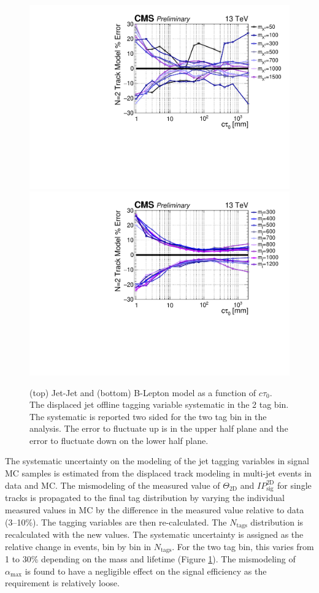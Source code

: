 \begin{figure}
\begin{center}
\includegraphics[width=.70\textwidth]{figures/an/SYSTEMATICS/76x_pu/sys_2tag_tracking.pdf}
\includegraphics[width=.70\textwidth]{figures/an/SYSTEMATICS/76x_pu/sys_2tag_tracking_dsusy.pdf}
\caption{(top) Jet-Jet and (bottom) B-Lepton
model as a function of $c\tau_0$.  The displaced jet offline tagging variable 
systematic in the 2 tag bin. The systematic is reported two sided for the two tag
 bin in the analysis. The error to fluctuate up is in the upper half plane and the
 error to fluctuate down on the lower half plane.  \label{fig:offline_tracking_sys}}
\end{center}
\end{figure}

The systematic uncertainty on the modeling of the jet tagging
variables in signal MC samples is estimated from the displaced track
modeling in multi-jet events in data and MC. The mismodeling of the
measured value of $\Theta_{\textrm{2D}}$ and $IP_{\textrm{sig}}^{\textrm{2D}}$ for
single tracks is propagated to the final tag distribution by varying
the individual measured values in MC by the difference in the measured
value relative to data (3--10\%). The tagging variables are then
re-calculated.  The $N_{\textrm{tags}}$ distribution is recalculated
with the new values. The systematic uncertainty is assigned as the
relative change in events, bin by bin in $N_{\textrm{tags}}$. For the
two tag bin, this varies from 1 to 30\% depending on the mass and
lifetime (Figure \ref{fig:offline_tracking_sys}). The mismodeling of
 $\alpha_{\textrm{max}}$ is found to have a negligible effect on the
 signal efficiency as the requirement is relatively loose.

